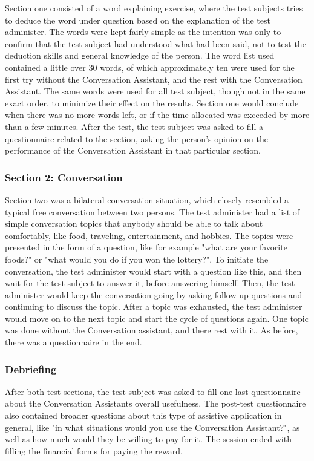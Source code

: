 \documentclass[english, 12pt, a4paper, pdftex, elec, utf8]{aaltothesis}
\begin{document}
Section one consisted of a word explaining exercise, where the test subjects tries to deduce the word under question based on the explanation of the test administer. The words were kept fairly simple as the intention was only to confirm that the test subject had understood what had been said, not to test the deduction skills and general knowledge of the person. The word list used contained a little over 30 words, of which approximately ten were used for the first try without the Conversation Assistant, and the rest with the Conversation Assistant. The same words were used for all test subject, though not in the same exact order, to minimize their effect on the results. Section one would conclude when there was no more words left, or if the time allocated was exceeded by more than a few minutes. After the test, the test subject was asked to fill a questionnaire related to the section, asking the person's opinion on the performance of the Conversation Assistant in that particular section.

\subsubsection{Section 2: Conversation}

Section two was a bilateral conversation situation, which closely resembled a typical free conversation between two persons. The test administer had a list of simple conversation topics that anybody should be able to talk about comfortably, like food, traveling, entertainment, and hobbies. The topics were presented in the form of a question, like for example "what are your favorite foods?" or "what would you do if you won the lottery?". To initiate the conversation, the test administer would start with a question like this, and then wait for the test subject to answer it, before answering himself. Then, the test administer would keep the conversation going by asking follow-up questions and continuing to discuss the topic. After a topic was exhausted, the test administer would move on to the next topic and start the cycle of questions again. One topic was done without the Conversation assistant, and there rest with it. As before, there was a questionnaire in the end.

\subsubsection{Debriefing}

After both test sections, the test subject was asked to fill one last questionnaire about the Conversation Assistants overall usefulness. The post-test questionnaire also contained broader questions about this type of assistive application in general, like "in what situations would you use the Conversation Assistant?", as well as how much would they be willing to pay for it. The session ended with filling the financial forms for paying the reward.
\end{document}
